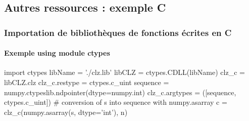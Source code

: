 \subsection{Autres ressources : exemple C}
\begin{frame}[fragile]
\frametitle{Importation de bibliothèques de fonctions écrites en C}
\framesubtitle{Exemple using module ctypes}
\begin{python}
import ctypes
libName = './clz.lib'
libCLZ = ctypes.CDLL(libName)
clz_c = libCLZ.clz
clz_c.restype = ctypes.c_uint
sequence = numpy.ctypeslib.ndpointer(dtype=numpy.int) 
clz_c.argtypes = ([sequence, ctypes.c_uint])
# conversion of s into sequence with numpy.asarray
c = clz_c(numpy.asarray(s, dtype='int'), n)
\end{python}
\end{frame}

